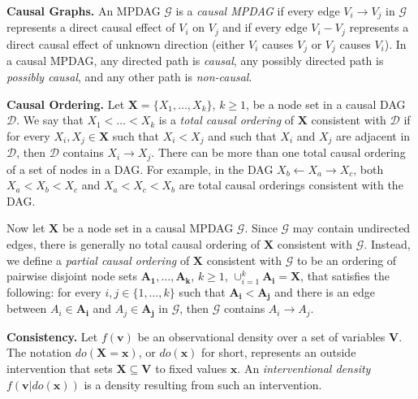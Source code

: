 \documentclass[11pt]{article}
\newcommand{\mb}[1]{\mathbf{#1}}
\newcommand{\g}[1][G]{\mathcal{#1}}
\begin{document}
\textbf{Causal Graphs.}
An MPDAG $\g$ is a \textit{causal MPDAG} if every edge $V_i \to V_j$ in $\g$ represents a direct causal effect of $V_i$ on $V_j$ and if every edge $V_i - V_j$ represents a direct causal effect of unknown direction (either $V_i$ causes $V_j$ or $V_j$ causes $V_i$). In a causal MPDAG, any directed path is \textit{causal}, any possibly directed path is \textit{possibly causal}, and any other path is \textit{non-causal}.

\textbf{Causal Ordering.} Let $\mb{X} = \{X_1, \dots, X_k\}$, $k \ge 1$, be a node set in a causal DAG $\g[D]$. We say that $X_1 < \dots < X_k$ is a \textit{total causal ordering} of $\mb{X}$ consistent with $\g[D]$ if for every $X_i, X_j \in \mb{X}$ such that $X_i < X_j$ and such that $X_i$ and $X_j$ are adjacent in $\g[D]$, then $\g[D]$ contains $X_i \to X_j$. There can be more than one total causal ordering of a set of nodes in a DAG. For example, in the DAG $X_b \gets X_a \to X_c$, both $X_a < X_b < X_c$ and $X_a < X_c < X_b$ are total causal orderings consistent with the DAG.

Now let $\mb{X}$ be a node set in a causal MPDAG $\g$. Since $\g$ may contain undirected edges, there is generally no total causal ordering of $\mb{X}$ consistent with $\g$. Instead, we define a \textit{partial causal ordering} of $\mb{X}$ consistent with $\g$ to be an ordering of pairwise disjoint node sets $\mb{A_1}, \dots, \mb{A_k}$, $k \ge 1$, $\cup_{i=1}^k \mb{A_i} = \mb{X}$, that satisfies the following: for every $i,j \in \{1, \dots, k\}$ such that $\mb{A_i} < \mb{A_j}$ and there is an edge between $A_i \in \mb{A_i}$ and $A_j \in \mb{A_j}$ in $\g$, then $\g$ contains $A_i \to A_j$.

\textbf{Consistency.}
Let $f(\mb{v})$ be an observational density over a set of variables $\mb{V}$. The notation $do(\mb{X} = \mb{x})$, or $do(\mb{x})$ for short, represents an outside intervention that sets $\mb{X} \subseteq \mb{V}$ to fixed values $\mb{x}$. An \textit{interventional density} $f(\mb{v}|do(\mb{x}))$ is a density resulting from such an intervention.
\end{document}

